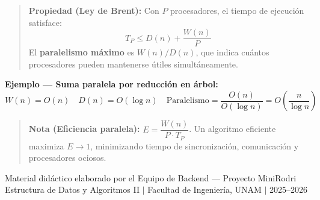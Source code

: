 \documentclass[12pt, letterpaper]{article}
\begin{document}
	\begin{quote}
		\textbf{Propiedad (Ley de Brent):}
		Con $P$ procesadores, el tiempo de ejecución satisface:
		\[
		T_P \leq D(n) + \frac{W(n)}{P}
		\]
		El \textbf{paralelismo máximo} es $W(n)/D(n)$, que indica cuántos procesadores pueden mantenerse útiles simultáneamente.
	\end{quote}
	
	\textbf{Ejemplo — Suma paralela por reducción en árbol:}
	\[
	W(n) = O(n) \quad D(n) = O(\log n) \quad \text{Paralelismo} = \frac{O(n)}{O(\log n)} = O\!\left(\frac{n}{\log n}\right)
	\]
	
	\begin{quote}
		\textbf{Nota (Eficiencia paralela):}
		$E = \dfrac{W(n)}{P \cdot T_P}$. Un algoritmo eficiente maximiza $E \to 1$, minimizando tiempo de sincronización, comunicación y procesadores ociosos.
	\end{quote}
	
	\vfill
	\begin{center}
		\color{gray}\small
		Material didáctico elaborado por el Equipo de Backend — Proyecto MiniRodri\\
		Estructura de Datos y Algoritmos II $\mid$ Facultad de Ingeniería, UNAM $\mid$ 2025--2026
	\end{center}
	
\end{document}
